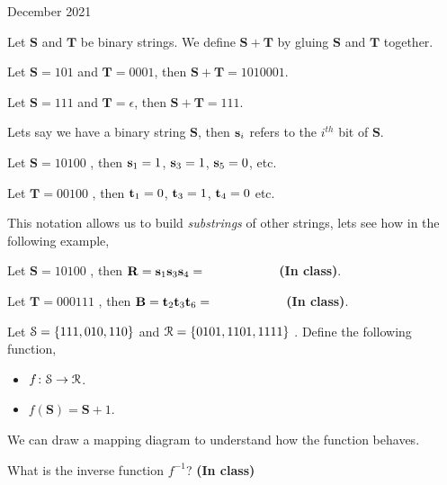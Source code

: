 \documentclass[12pt,oneside]{book} %
\begin{document}
\begin{lec}{December 2021}
\begin{defn}
    Let $\mathbf{S}$ and $\mathbf{T}$ be binary strings. We define $\mathbf{S} + \mathbf{T}$ by gluing $\mathbf{S}$ and 
    $\mathbf{T}$ together.
\end{defn}

\begin{ex}
  Let $\mathbf{S} = 101$ and  $\mathbf{T} = 0001$, then  $\mathbf{S} + \mathbf{T} = 1010001$.
\end{ex}


\begin{ex}
  Let $\mathbf{S} = 111$ and  $\mathbf{T} = \epsilon$, then  $\mathbf{S} + \mathbf{T} = 111$.
\end{ex}

\begin{notn}
  Lets say we have a binary string $\mathbf{S}$, then $\vb s_i$ refers to the $i^{th}$ bit of $\mathbf{S}$. 
\end{notn}

\begin{ex}
  Let $\mathbf{S} = 10100$ , then $\vb s_1 = 1$, $\vb s_3 = 1$, $\vb s_5 = 0$, etc.
\end{ex}

\begin{ex}
  Let $\mathbf{T} = 00100$ , then $\vb t_1 = 0$, $\vb t_3 = 1$, $\vb t_4 = 0$ etc.
\end{ex}
 
This notation allows us to build \emph{substrings} of other strings, lets see how in the following example,

\begin{ex}
  Let $\mathbf{S} = 10100$ , then $\mathbf{R} = \vb s_1\vb s_3\vb s_4 = \hspace*{2cm}$ \textbf{(In class)}.
\end{ex}

\begin{ex}
  Let $\mathbf{T} = 000111$ , then $\mathbf{B} = \vb t_2\vb t_3\vb t_6 = \hspace*{2cm}$ \textbf{(In class)}.
\end{ex}

\begin{ex}
  Let $\EuScript{S} = \{111,010,110\}$ and $\EuScript{R} = \{0101,1101,1111\} $ . Define the following function,
  \begin{itemize}
    \item $f \colon \EuScript{S} \to \EuScript{R}$. 
    \item $f(\mathbf{S}) = \mathbf{S} + 1$.
  \end{itemize}
  We can draw a mapping diagram to understand how the function behaves.
  \begin{qstn}
    What is the inverse function $f^{-1}$? \textbf{(In class)}
  \end{qstn}
\end{ex}



















	\end{lec}
\end{document}

